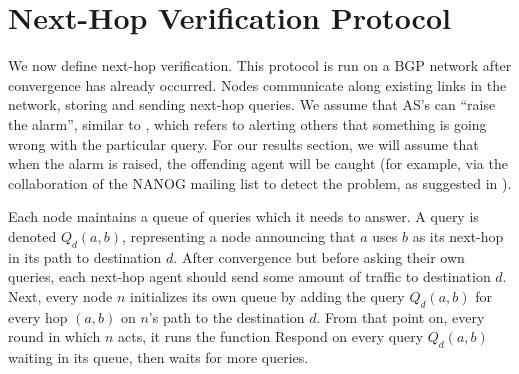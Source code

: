\documentclass[10pt]{article}
\begin{document}
\section{Next-Hop Verification Protocol}
  We now define next-hop verification.
  This protocol is run on a BGP network after convergence has already occurred.
  Nodes communicate along existing links in the network, storing and sending
  next-hop queries. We assume that AS's can ``raise the alarm'', similar to
  \cite{Attraction}, which refers to alerting others that something
  is going wrong with the particular query. For our results section,
  we will assume that when the alarm is raised, the offending agent will be
  caught (for example, via the collaboration of the NANOG mailing list to detect
  the problem, as suggested in \cite{Attraction}).

  Each node maintains a queue of queries which it needs to answer.
  A query is denoted $Q_d(a,b)$, representing a node announcing that
  $a$ uses $b$ as its next-hop in its path to destination $d$.
  After convergence but before asking their own queries, each next-hop agent
  should send some amount of traffic to destination $d$.
  Next, every node $n$ initializes its own queue by adding the query $Q_d(a,b)$
  for every hop $(a,b)$ on $n$'s path to the destination $d$.
  From that point on, every round in which $n$ acts, it runs the function
  {\sc Respond} on every query $Q_d(a,b)$ waiting in its queue,
  then waits for more queries.
\end{document}
